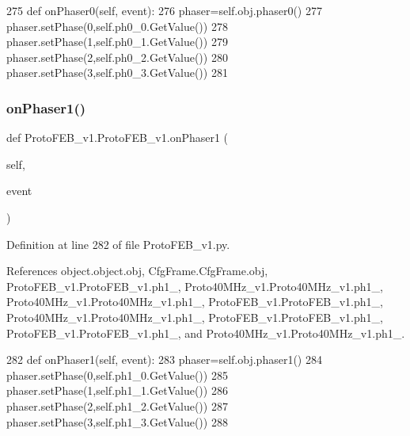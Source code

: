 \begin{DoxyCode}
275     \textcolor{keyword}{def }onPhaser0(self, event):
276         phaser=self.obj.phaser0()
277         phaser.setPhase(0,self.ph0\_0.GetValue())
278         phaser.setPhase(1,self.ph0\_1.GetValue())
279         phaser.setPhase(2,self.ph0\_2.GetValue())
280         phaser.setPhase(3,self.ph0\_3.GetValue())
281 
\end{DoxyCode}
\mbox{\label{classProtoFEB__v1_1_1ProtoFEB__v1_a7ca754417fbe0aefab173753713c02d3}} 
\subsubsection{\texorpdfstring{on\+Phaser1()}{onPhaser1()}}
{\footnotesize\ttfamily def Proto\+F\+E\+B\+\_\+v1.\+Proto\+F\+E\+B\+\_\+v1.\+on\+Phaser1 (\begin{DoxyParamCaption}\item[{}]{self,  }\item[{}]{event }\end{DoxyParamCaption})}



Definition at line 282 of file Proto\+F\+E\+B\+\_\+v1.\+py.



References object.\+object.\+obj, Cfg\+Frame.\+Cfg\+Frame.\+obj, Proto\+F\+E\+B\+\_\+v1.\+Proto\+F\+E\+B\+\_\+v1.\+ph1\+\_, Proto40\+M\+Hz\+\_\+v1.\+Proto40\+M\+Hz\+\_\+v1.\+ph1\+\_, Proto40\+M\+Hz\+\_\+v1.\+Proto40\+M\+Hz\+\_\+v1.\+ph1\+\_, Proto\+F\+E\+B\+\_\+v1.\+Proto\+F\+E\+B\+\_\+v1.\+ph1\+\_, Proto40\+M\+Hz\+\_\+v1.\+Proto40\+M\+Hz\+\_\+v1.\+ph1\+\_, Proto\+F\+E\+B\+\_\+v1.\+Proto\+F\+E\+B\+\_\+v1.\+ph1\+\_, Proto\+F\+E\+B\+\_\+v1.\+Proto\+F\+E\+B\+\_\+v1.\+ph1\+\_, and Proto40\+M\+Hz\+\_\+v1.\+Proto40\+M\+Hz\+\_\+v1.\+ph1\+\_.


\begin{DoxyCode}
282     \textcolor{keyword}{def }onPhaser1(self, event):
283         phaser=self.obj.phaser1()
284         phaser.setPhase(0,self.ph1\_0.GetValue())
285         phaser.setPhase(1,self.ph1\_1.GetValue())
286         phaser.setPhase(2,self.ph1\_2.GetValue())
287         phaser.setPhase(3,self.ph1\_3.GetValue())
288 
\end{DoxyCode}
\mbox{\label{classProtoFEB__v1_1_1ProtoFEB__v1_a4680b8cb99ce517798f9c0bb7b4c4d0d}} 
